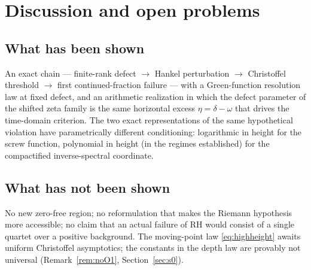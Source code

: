 \documentclass[11pt]{amsart}
\theoremstyle{definition}
\theoremstyle{remark}
\begin{document}
\section{Discussion and open problems}\label{sec:discussion}

\subsection{What has been shown}
An exact chain --- finite-rank defect $\to$ Hankel perturbation $\to$
Christoffel threshold $\to$ first continued-fraction failure --- with a
Green-function resolution law at fixed defect, and an arithmetic realization
in which the defect parameter of the shifted zeta family is the same
horizontal excess $\eta=\delta-\omega$ that drives the time-domain
criterion. The two exact representations of the same hypothetical violation
have parametrically different conditioning: logarithmic in height for the
screw function, polynomial in height (in the regimes established) for the
compactified inverse-spectral coordinate.

\subsection{What has not been shown}
No new zero-free region; no reformulation that makes the Riemann hypothesis
more accessible; no claim that an actual failure of RH would consist of a
single quartet over a positive background. The moving-point law
\eqref{eq:highheight} awaits uniform Christoffel asymptotics; the constants
in the depth law are provably not universal
(Remark~\ref{rem:noO1}, Section~\ref{sec:s0}).
\end{document}
